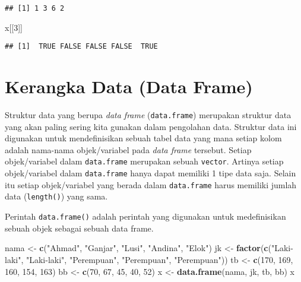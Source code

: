 \documentclass[
]{book}
\newenvironment{Shaded}{\begin{snugshade}}{\end{snugshade}}
\newcommand{\DecValTok}[1]{\textcolor[rgb]{0.00,0.00,0.81}{#1}}
\newcommand{\KeywordTok}[1]{\textcolor[rgb]{0.13,0.29,0.53}{\textbf{#1}}}
\newcommand{\NormalTok}[1]{#1}
\newcommand{\OperatorTok}[1]{\textcolor[rgb]{0.81,0.36,0.00}{\textbf{#1}}}
\newcommand{\StringTok}[1]{\textcolor[rgb]{0.31,0.60,0.02}{#1}}
\begin{document}
\begin{Shaded}
\end{Shaded}

\begin{verbatim}
## [1] 1 3 6 2
\end{verbatim}

\begin{Shaded}
\begin{Highlighting}[]
\NormalTok{x[[}\DecValTok{3}\NormalTok{]]}
\end{Highlighting}
\end{Shaded}

\begin{verbatim}
## [1]  TRUE FALSE FALSE FALSE  TRUE
\end{verbatim}

\hypertarget{dataframe}{%
\section{Kerangka Data (Data Frame)}\label{dataframe}}

Struktur data yang berupa \emph{data frame} (\texttt{data.frame}) merupakan struktur data yang akan paling sering kita gunakan dalam pengolahan data. Struktur data ini digunakan untuk mendefinisikan sebuah tabel data yang mana setiap kolom adalah nama-nama objek/variabel pada \emph{data frame} tersebut. Setiap objek/variabel dalam \texttt{data.frame} merupakan sebuah \texttt{vector}. Artinya setiap objek/variabel dalam \texttt{data.frame} hanya dapat memiliki 1 tipe data saja. Selain itu setiap objek/variabel yang berada dalam \texttt{data.frame} harus memiliki jumlah data (\texttt{length()}) yang sama.

Perintah \texttt{data.frame()} adalah perintah yang digunakan untuk medefinisikan sebuah objek sebagai sebuah data frame.

\begin{Shaded}
\begin{Highlighting}[]
\NormalTok{nama <-}\StringTok{ }\KeywordTok{c}\NormalTok{(}\StringTok{"Ahmad"}\NormalTok{, }\StringTok{"Ganjar"}\NormalTok{, }\StringTok{"Lusi"}\NormalTok{, }\StringTok{"Andina"}\NormalTok{, }\StringTok{"Elok"}\NormalTok{)}
\NormalTok{jk   <-}\StringTok{ }\KeywordTok{factor}\NormalTok{(}\KeywordTok{c}\NormalTok{(}\StringTok{"Laki-laki"}\NormalTok{, }\StringTok{"Laki-laki"}\NormalTok{, }\StringTok{"Perempuan"}\NormalTok{, }\StringTok{"Perempuan"}\NormalTok{, }\StringTok{"Perempuan"}\NormalTok{))}
\NormalTok{tb   <-}\StringTok{ }\KeywordTok{c}\NormalTok{(}\DecValTok{170}\NormalTok{, }\DecValTok{169}\NormalTok{, }\DecValTok{160}\NormalTok{, }\DecValTok{154}\NormalTok{, }\DecValTok{163}\NormalTok{)}
\NormalTok{bb   <-}\StringTok{ }\KeywordTok{c}\NormalTok{(}\DecValTok{70}\NormalTok{, }\DecValTok{67}\NormalTok{, }\DecValTok{45}\NormalTok{, }\DecValTok{40}\NormalTok{, }\DecValTok{52}\NormalTok{)}
\NormalTok{x    <-}\StringTok{ }\KeywordTok{data.frame}\NormalTok{(nama, jk, tb, bb)}
\NormalTok{x}
\end{Highlighting}
\end{Shaded}
\end{document}
